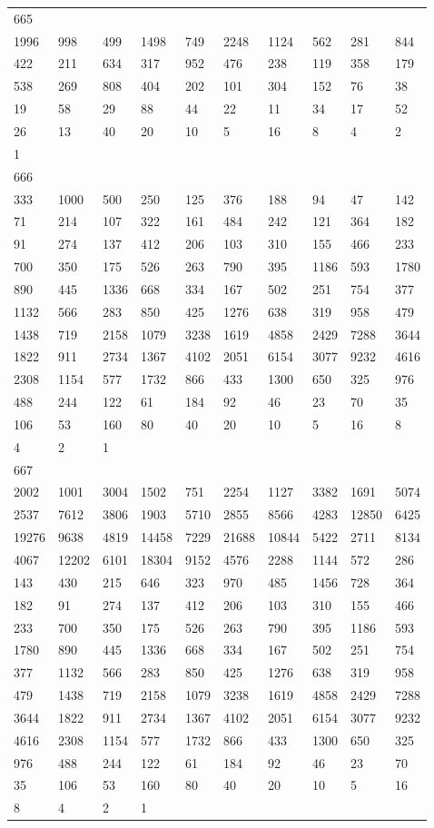 \begin{longtable}{*{10}{l}}
665&&&&&&&&&\\
1996& 998& 499& 1498& 749& 2248& 1124& 562& 281& 844\\
422& 211& 634& 317& 952& 476& 238& 119& 358& 179\\
538& 269& 808& 404& 202& 101& 304& 152& 76& 38\\
19& 58& 29& 88& 44& 22& 11& 34& 17& 52\\
26& 13& 40& 20& 10& 5& 16& 8& 4& 2\\
1& \\

666&&&&&&&&&\\
333& 1000& 500& 250& 125& 376& 188& 94& 47& 142\\
71& 214& 107& 322& 161& 484& 242& 121& 364& 182\\
91& 274& 137& 412& 206& 103& 310& 155& 466& 233\\
700& 350& 175& 526& 263& 790& 395& 1186& 593& 1780\\
890& 445& 1336& 668& 334& 167& 502& 251& 754& 377\\
1132& 566& 283& 850& 425& 1276& 638& 319& 958& 479\\
1438& 719& 2158& 1079& 3238& 1619& 4858& 2429& 7288& 3644\\
1822& 911& 2734& 1367& 4102& 2051& 6154& 3077& 9232& 4616\\
2308& 1154& 577& 1732& 866& 433& 1300& 650& 325& 976\\
488& 244& 122& 61& 184& 92& 46& 23& 70& 35\\
106& 53& 160& 80& 40& 20& 10& 5& 16& 8\\
4& 2& 1& \\

667&&&&&&&&&\\
2002& 1001& 3004& 1502& 751& 2254& 1127& 3382& 1691& 5074\\
2537& 7612& 3806& 1903& 5710& 2855& 8566& 4283& 12850& 6425\\
19276& 9638& 4819& 14458& 7229& 21688& 10844& 5422& 2711& 8134\\
4067& 12202& 6101& 18304& 9152& 4576& 2288& 1144& 572& 286\\
143& 430& 215& 646& 323& 970& 485& 1456& 728& 364\\
182& 91& 274& 137& 412& 206& 103& 310& 155& 466\\
233& 700& 350& 175& 526& 263& 790& 395& 1186& 593\\
1780& 890& 445& 1336& 668& 334& 167& 502& 251& 754\\
377& 1132& 566& 283& 850& 425& 1276& 638& 319& 958\\
479& 1438& 719& 2158& 1079& 3238& 1619& 4858& 2429& 7288\\
3644& 1822& 911& 2734& 1367& 4102& 2051& 6154& 3077& 9232\\
4616& 2308& 1154& 577& 1732& 866& 433& 1300& 650& 325\\
976& 488& 244& 122& 61& 184& 92& 46& 23& 70\\
35& 106& 53& 160& 80& 40& 20& 10& 5& 16\\
8& 4& 2& 1& \\


\end{longtable}
